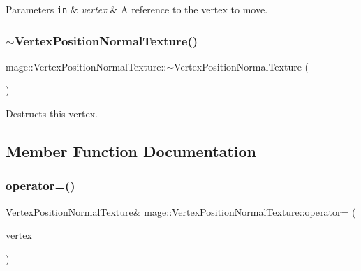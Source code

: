 \begin{DoxyParams}[1]{Parameters}
\mbox{\tt in}  & {\em vertex} & A reference to the vertex to move. \\
\hline
\end{DoxyParams}
\hypertarget{structmage_1_1_vertex_position_normal_texture_a1dbfd9a6f88f075b59e56c353986b189}{}\label{structmage_1_1_vertex_position_normal_texture_a1dbfd9a6f88f075b59e56c353986b189} 
\subsubsection{\texorpdfstring{$\sim$\+Vertex\+Position\+Normal\+Texture()}{~VertexPositionNormalTexture()}}
{\footnotesize\ttfamily mage\+::\+Vertex\+Position\+Normal\+Texture\+::$\sim$\+Vertex\+Position\+Normal\+Texture (\begin{DoxyParamCaption}{ }\end{DoxyParamCaption})\hspace{0.3cm}{\ttfamily [default]}}

Destructs this vertex. 

\subsection{Member Function Documentation}
\hypertarget{structmage_1_1_vertex_position_normal_texture_a89b92b0932f3271cb90c3a800e6c60a3}{}\label{structmage_1_1_vertex_position_normal_texture_a89b92b0932f3271cb90c3a800e6c60a3} 
\subsubsection{\texorpdfstring{operator=()}{operator=()}\hspace{0.1cm}{\footnotesize\ttfamily [1/2]}}
{\footnotesize\ttfamily \hyperlink{structmage_1_1_vertex_position_normal_texture}{Vertex\+Position\+Normal\+Texture}\& mage\+::\+Vertex\+Position\+Normal\+Texture\+::operator= (\begin{DoxyParamCaption}\item[{const \hyperlink{structmage_1_1_vertex_position_normal_texture}{Vertex\+Position\+Normal\+Texture} \&}]{vertex }\end{DoxyParamCaption})\hspace{0.3cm}{\ttfamily [default]}}

